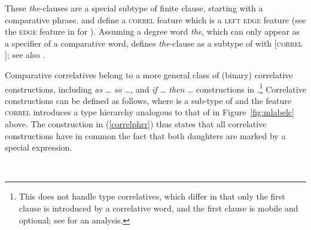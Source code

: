 \documentclass[output=paper
                ,modfonts
                ,nonflat
	        ,collection
	        ,collectionchapter
	        ,collectiontoclongg
 	        ,biblatex
                ,babelshorthands
                ,newtxmath
                ,draftmode
                ,colorlinks, citecolor=brown
]{./langsci/langscibook}
\begin{document}
{\begin{exe}
 \ex
\begin{xlista}
\end{xlista}\label{intell}
\end{exe}

These \emph{the}-clauses  are a special subtype of finite clause, starting with a comparative
phrase. \citet[]{Abeille:Borsley:Espinal:06} and \citet[]{Borsley:11} 
define a \textsc{correl} feature which is a \textsc{left edge} feature (see the \textsc{edge}
feature in \citet{Bonami:2004} for  ).
 Assuming a degree word \textit{the}, which can only appear as a specifier of
a comparative word, \citet[]{Borsley:11}  defines \textit{the}-clause as a subtype of  with [\textsc{correl} ]; see also \citet[]{fgsag08}.

Comparative correlatives belong to a more general class of (binary) correlative constructions, including \emph{as \ldots{} so \ldots{}},
and \emph{if \ldots{} then  \ldots{}} constructions in 
\parencites[Section~3.2]{Borsley:04}[--18]{Borsley:11}.\footnote{This does not handle  type correlatives, which differ in that  only the first clause is introduced by a correlative word, and the first clause is mobile and optional; see \citet[228]{pollardsag} for an analysis.}
Correlative constructions can be defined as follows, 
where  is a sub-type of 
 and the feature \textsc{correl} introduces a  type
hierarchy analogous to that of  in Figure~\ref{fig:mlabelc} above.
The construction in (\ref{correlphrr}) thus states that all correlative
constructions have in common the fact that both daughters are marked by a special expression. 

\ea
\label{correlphrr}
 \impl\\
\z

}
\end{document}

